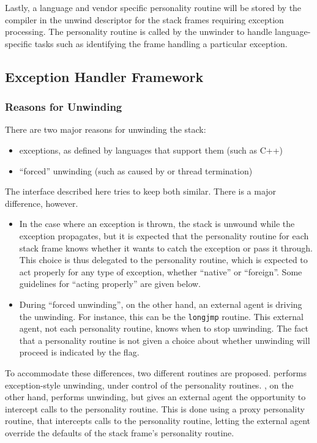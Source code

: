 Lastly, a language and vendor specific personality routine will be
stored by the compiler in the unwind descriptor for the stack frames
requiring exception processing. The personality routine is called by
the unwinder to handle language-specific tasks such as identifying the
frame handling a particular exception.

\subsection{Exception Handler Framework}

\subsubsection{Reasons for Unwinding}
There are two major reasons for unwinding the stack:
\begin{itemize}
  \item exceptions, as defined by languages that support them (such as C++)
  \item ``forced'' unwinding (such as caused by  or thread
    termination)
\end{itemize}

The interface described here tries to keep both similar. There is a
major difference, however.
\begin{itemize}

\item In the case where an exception is thrown, the stack is unwound
while the exception propagates, but it is expected that the personality
routine for each stack frame knows whether it wants to catch the exception
or pass it through. This choice is thus delegated to the personality
routine, which is expected to act properly for any type of exception,
whether ``native'' or ``foreign''.  Some guidelines for ``acting properly''
are given below.

\item During ``forced unwinding'', on the other hand, an external agent is
driving the unwinding. For instance, this can be the \texttt{longjmp}
routine. This external agent, not each personality routine,
knows when to stop unwinding. The fact that a personality routine is
not given a choice about whether unwinding will proceed is indicated by the
 flag.
\end{itemize}

\begin{sloppypar}
To accommodate these differences, two different routines are proposed.
 performs exception-style unwinding,
under control of the personality routines. ,
on the other hand, performs unwinding, but gives an external agent the
opportunity to intercept calls to the personality routine. This is done using
a proxy personality routine, that intercepts calls to the personality routine,
letting the external agent override the defaults of the stack frame's
personality routine.
\end{sloppypar}


